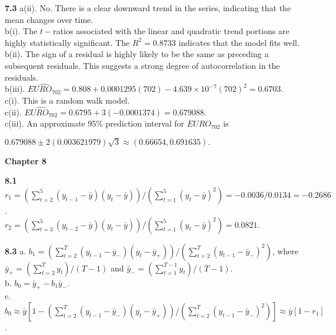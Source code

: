 \textbf{7.3} a(ii). No. There is a clear downward trend in the
series, indicating
that the mean changes over time.\\
b(i). The $t-$ratios associated with the linear and quadratic trend
portions are highly statistically significant. The $R^2 = 0.8733$
indicates that the model fits well.\\
b(ii). The sign of a residual is highly likely to be the same as
preceding a subsequent residuals. This suggests a strong degree of
autocorrelation in the residuals.\\
b(iii). $\widehat{EURO_{702}} = 0.808 + 0.0001295(702) - 4.639
\times 10^{-7}(702)^2 = 0.6703.$\\
c(i). This is a random walk model.\\
c(ii). $\widehat{EURO_{702}} = 0.6795 + 3(-0.0001374) =
0.679088.$\\
c(iii).  An approximate 95\% prediction interval for $EURO_{702}$ is

$0.679088\pm2(0.003621979)\sqrt{3} \approx (0.66654, 0.691635).$


\begin{center}\large \textbf{Chapter 8}\end{center}

\textbf{8.1} $r_1=\left(\sum_{t=2}^{5}(y_{t-1}-\bar y)(y_{t}-\bar
y)\right) /\left(\sum_{t=1}^{5}(y_{t}-\bar y)^{2}\right) = -0.0036/0.0134 = -0.2686$.\\

\noindent$r_2= \left(\sum_{t=3}^{5}(y_{t-2}-\bar y)(y_{t}-\bar
y)\right) /\left(\sum_{t=1}^{5}(y_{t}-\bar y)^{2}\right) = 0.0821$.

\textbf{8.3} a. $b_1= \left(\sum_{t=2}^{T}(y_{t-1}-\bar
y_{-})(y_t-\bar y_{+})\right) /\left(\sum_{t=2}^{T}(y_{t-1}-\bar
y_{-})^2\right)$,\newline
where $\bar y_{+}=\left(\sum_{t=2}^{T}y_{t}\right)/(T-1)$ and $\bar y_{-}=\left(\sum_{t=1}^{T-1}y_{t} \right)/(T-1)$.\\
b.
$b_0=\bar y_{+}-b_1 \bar y_{-}$.\\
c. $b_0\approx \bar y \left[ 1- \left(\sum_{t=2}^{T}(y_{t-1}-\bar
y_{-})(y_t-\bar y_{+})\right) /\left(\sum_{t=2}^{T}(y_{t-1}-\bar
y_{-})^2\right) \right] \approx \bar y \left[1-r_1\right]$.

